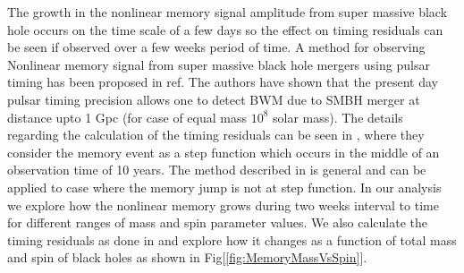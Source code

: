 \documentclass[twocolumn,showpacs,aps,prd,nobibnotes,floatfix]{revtex4-1}
\begin{document}
The growth in the nonlinear memory signal amplitude from super massive black hole occurs on the time scale of a few days so the effect on timing residuals can be seen if observed over a few weeks period of time. A method for observing Nonlinear memory signal from super massive black hole mergers using pulsar timing has been proposed in ref\cite{Pshirkov2010}. The authors have shown that the present day pulsar timing precision allows one to detect BWM due to  SMBH merger at distance upto 1 Gpc (for case of equal mass $10^{8}$ solar mass). The details regarding the calculation of the timing residuals can be seen in \cite{Pshirkov2010}, where they consider the memory event as a step function which occurs in the middle of an observation time of 10 years. The method described in \cite{Pshirkov2010} is general and can be applied to case where the memory jump is not at step function. In our analysis we explore how the nonlinear memory grows during two weeks interval to time for different ranges of mass and spin parameter values. We also calculate the timing residuals as done in \cite{Pshirkov2010} and explore how it changes as a function of total mass and spin of black holes as shown in Fig[\ref{fig:MemoryMassVsSpin}].
\par 
\end{document}
